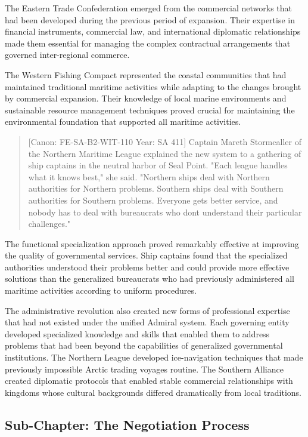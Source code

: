 The Eastern Trade Confederation emerged from the commercial networks
that had been developed during the previous period of expansion. Their
expertise in financial instruments, commercial law, and international
diplomatic relationships made them essential for managing the complex
contractual arrangements that governed inter-regional commerce.

The Western Fishing Compact represented the coastal communities that had
maintained traditional maritime activities while adapting to the changes
brought by commercial expansion. Their knowledge of local marine
environments and sustainable resource management techniques proved
crucial for maintaining the environmental foundation that supported all
maritime activities.

\begin{quote}
{[}Canon: FE-SA-B2-WIT-110 \textbar{} Year: SA 411{]} Captain Mareth
Stormcaller of the Northern Maritime League explained the new system to
a gathering of ship captains in the neutral harbor of Seal Point. "Each
league handles what it knows best," she said. "Northern ships deal with
Northern authorities for Northern problems. Southern ships deal with
Southern authorities for Southern problems. Everyone gets better
service, and nobody has to deal with bureaucrats who
don\textquotesingle t understand their particular challenges."
\end{quote}

The functional specialization approach proved remarkably effective at
improving the quality of governmental services. Ship captains found that
the specialized authorities understood their problems better and could
provide more effective solutions than the generalized bureaucrats who
had previously administered all maritime activities according to uniform
procedures.

The administrative revolution also created new forms of professional
expertise that had not existed under the unified Admiral system. Each
governing entity developed specialized knowledge and skills that enabled
them to address problems that had been beyond the capabilities of
generalized governmental institutions. The Northern League developed
ice-navigation techniques that made previously impossible Arctic trading
voyages routine. The Southern Alliance created diplomatic protocols that
enabled stable commercial relationships with kingdoms whose cultural
backgrounds differed dramatically from local traditions.

\subsection{Sub-Chapter: The Negotiation
Process}\label{sub-chapter-the-negotiation-process}

